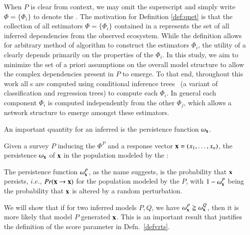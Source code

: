 \documentclass[onecolumn,10pt]{IEEEtran}
\begin{document}
When $P$ is clear from context, we may omit the superscript and simply write $\Phi = \{\Phi_i\}$ to denote the \qnet. The motivation for Definition \ref{def:qnet} is that the collection of all estimators $\Phi = \{ \Phi_i \}$ contained in a \qnet represents the set of all inferred dependencies from the observed ecosystem.  While the definition allows for arbitrary method of algorithm to construct the estimators $\Phi_i$, the utility of a \qnet clearly depends primarily on the properties of the $\Phi_i$.  In this study, we aim to minimize the set of a priori assumptions on the overall model structure to allow the complex dependencies present in $P$ to emerge. To that end, throughout this work all {\qnet}s are computed using conditional inference trees~\cite{sarda2017conditional} (a variant of classification and regression trees) to compute each $\Phi_i$. In general each \qnet component $\Phi_i$ is computed independently from the other $\Phi_j$, which allows a network structure to emerge amongst these estimators.

An important quantity for an inferred \qnet is the persistence function $\omega_{\bm{\mathrm{x}}}$.

% 
\begin{defn}\label{def:mem}
  Given a survey $P$ inducing the \qnet $\Phi^P$ and a response  vector $\bm{\mathrm{x}} = (x_1, \ldots, x_n)$, the persistence $\omega_{\bm{\mathrm{x}}}$ of  $\bm{\mathrm{x}}$ in the population modeled  by the \qnet:
\end{defn}
The persistence function $\omega_{\bm{\mathrm{x}}}^P$, as the name suggests,  is the probability that $\bm{\mathrm{x}}$ persists, $i.e.$,  $Pr(\bm{\mathrm{x}} \rightarrow \bm{\mathrm{x}})$ for the population modeled by the \qnet $P$, with $1-\omega_{\bm{\mathrm{x}}}^P$ being the probability that $\bm{\mathrm{x}}$ is altered by a  random perturbation.

We will show  that if for two inferred \qnet models $P,Q$, we have $\omega_{\bm{\mathrm{x}}}^P \geqq \omega_{\bm{\mathrm{x}}}^Q$, then it is more likely that model $P$ generated $\bm{\mathrm{x}}$. This is an important result that justifies the definition of the
score parameter in Defn.~\ref{defvrts}.


\end{document}
